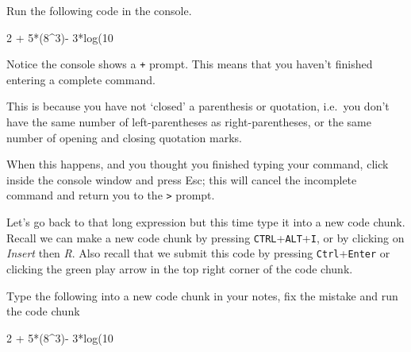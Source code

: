 \documentclass[
  letterpaper,
  DIV=11,
  numbers=noendperiod,
  oneside]{scrreprt}
\newenvironment{Shaded}{\begin{snugshade}}{\end{snugshade}}
\newcommand{\DecValTok}[1]{\textcolor[rgb]{0.68,0.00,0.00}{#1}}
\newcommand{\FunctionTok}[1]{\textcolor[rgb]{0.28,0.35,0.67}{#1}}
\newcommand{\NormalTok}[1]{\textcolor[rgb]{0.00,0.23,0.31}{#1}}
\newcommand{\SpecialCharTok}[1]{\textcolor[rgb]{0.37,0.37,0.37}{#1}}
\begin{document}
\begin{tcolorbox}[enhanced jigsaw, bottomrule=.15mm, colback=white, colframe=quarto-callout-tip-color-frame, toprule=.15mm, coltitle=black, rightrule=.15mm, opacitybacktitle=0.6, colbacktitle=quarto-callout-tip-color!10!white, toptitle=1mm, leftrule=.75mm, breakable, bottomtitle=1mm, titlerule=0mm, title={👉 Your Turn}, arc=.35mm, left=2mm, opacityback=0]

Run the following code in the console.

\begin{Shaded}
\begin{Highlighting}[]
\DecValTok{2} \SpecialCharTok{+} \DecValTok{5}\SpecialCharTok{*}\NormalTok{(}\DecValTok{8}\SpecialCharTok{\^{}}\DecValTok{3}\NormalTok{)}\SpecialCharTok{{-}} \DecValTok{3}\SpecialCharTok{*}\FunctionTok{log}\NormalTok{(}\DecValTok{10}
\end{Highlighting}
\end{Shaded}

\end{tcolorbox}

Notice the console shows a \texttt{+} prompt. This means that you
haven't finished entering a complete command.

This is because you have not `closed' a parenthesis or quotation,
i.e.~you don't have the same number of left-parentheses as
right-parentheses, or the same number of opening and closing quotation
marks.

When this happens, and you thought you finished typing your command,
click inside the console window and press Esc; this will cancel the
incomplete command and return you to the \texttt{\textgreater{}} prompt.

Let's go back to that long expression but this time type it into a new
code chunk. Recall we can make a new code chunk by pressing
\texttt{CTRL}+\texttt{ALT}+\texttt{I}, or by clicking on \emph{Insert}
then \emph{R}. Also recall that we submit this code by pressing
\texttt{Ctrl}+\texttt{Enter} or clicking the green play arrow in the top
right corner of the code chunk.

\begin{tcolorbox}[enhanced jigsaw, bottomrule=.15mm, colback=white, colframe=quarto-callout-tip-color-frame, toprule=.15mm, coltitle=black, rightrule=.15mm, opacitybacktitle=0.6, colbacktitle=quarto-callout-tip-color!10!white, toptitle=1mm, leftrule=.75mm, breakable, bottomtitle=1mm, titlerule=0mm, title={👉 Your Turn}, arc=.35mm, left=2mm, opacityback=0]

Type the following into a new code chunk in your notes, fix the mistake
and run the code chunk

\begin{Shaded}
\begin{Highlighting}[]
\DecValTok{2} \SpecialCharTok{+} \DecValTok{5}\SpecialCharTok{*}\NormalTok{(}\DecValTok{8}\SpecialCharTok{\^{}}\DecValTok{3}\NormalTok{)}\SpecialCharTok{{-}} \DecValTok{3}\SpecialCharTok{*}\FunctionTok{log}\NormalTok{(}\DecValTok{10}
\end{Highlighting}
\end{Shaded}

\end{tcolorbox}
\end{document}
